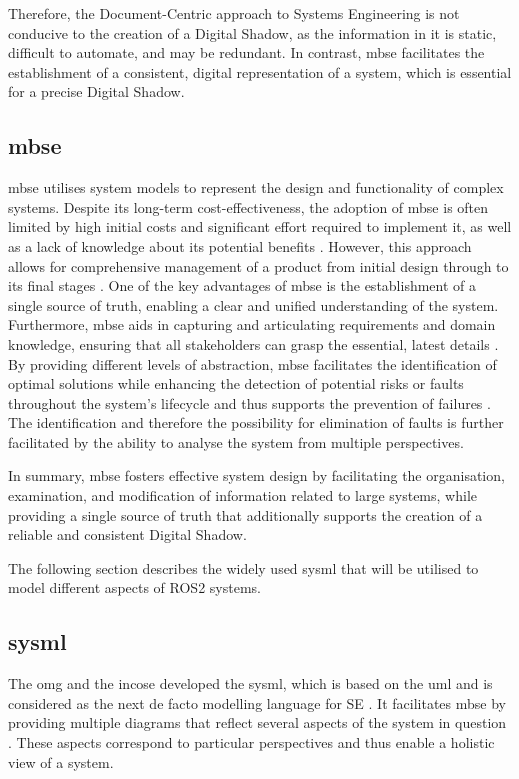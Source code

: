     Therefore, the Document-Centric approach to Systems Engineering is not conducive to the creation of a Digital Shadow, as the information in it is static, difficult to automate, and may be redundant. In contrast, \acl{mbse} facilitates the establishment of a consistent, digital representation of a system, which is essential for a precise Digital Shadow.


    \subsection{\acl{mbse}} \label{subsec:MBSE}
    \acf{mbse} utilises system models to represent the design and functionality of complex systems. Despite its long-term cost-effectiveness, the adoption of \ac{mbse} is often limited by high initial costs and significant effort required to implement it, as well as a lack of knowledge about its potential benefits \cite[p.~2341]{AugmentingMBSEwithDigitalTwinTechnology}\cite[p.~7ff]{MBSEandDTcosts}. However, this approach allows for comprehensive management of a product from initial design through to its final stages \cite[p.~17]{book:practicalGuideToSysML}. One of the key advantages of \ac{mbse} is the establishment of a single source of truth, enabling a clear and unified understanding of the system. Furthermore, \ac{mbse} aids in capturing and articulating requirements and domain knowledge, ensuring that all stakeholders can grasp the essential, latest details \cite[p.~102ff]{MBSEemergingApproach}. By providing different levels of abstraction, \ac{mbse} facilitates the identification of optimal solutions while enhancing the detection of potential risks or faults throughout the system's lifecycle and thus supports the prevention of failures \cite[p.~103]{MBSEreview}. The identification and therefore the possibility for elimination of faults is further facilitated by the ability to analyse the system from multiple perspectives.
    
    In summary, \ac{mbse} fosters effective system design by facilitating the organisation, examination, and modification of information related to large systems, while providing a single source of truth that additionally supports the creation of a reliable and consistent Digital Shadow.

    The following section describes the widely used \acl{sysml} that will be utilised to model different aspects of ROS2 systems.

    \subsection{\acl{sysml}} \label{subsec:SysML}
    The \ac{omg} and the \ac{incose} developed the \acf{sysml}, which is based on the \ac{uml} \cite[p.~4]{sysml} and is \glqq{}considered as the next de facto modelling language for SE\grqq{} \cite[p.~104]{MBSEemergingApproach}. It facilitates \ac{mbse} by providing multiple diagrams that reflect several aspects of the system in question \cite[p.~104]{MBSEemergingApproach}. These aspects correspond to particular perspectives and thus enable a holistic view of a system.

